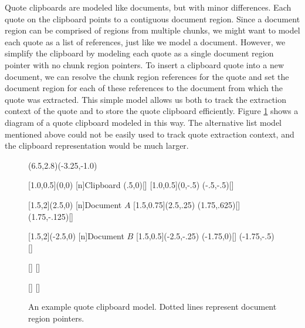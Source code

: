 \documentclass{acm_proc_article-sp}
\begin{document}
Quote clipboards are modeled like documents, but with minor differences.
Each quote on the clipboard points to a contiguous document region.
Since a  document region can be comprised of regions from multiple chunks, we might want to model each quote as a list of references, just like we model a document.
However, we simplify the clipboard by modeling each quote as a single document region pointer with no chunk region pointers.
To insert a clipboard quote into a new document, we can resolve the chunk region references for the quote and set the document region for each of these references to the document from which the quote was extracted.
This simple model allows us both to track the extraction context of the quote and to store the quote clipboard efficiently.
Figure \ref{fig:quoteClipboardModel} shows a diagram of a quote clipboard modeled in this way.
The alternative list model mentioned above could not be easily used to track quote extraction context, and the clipboard representation would be much larger.


\begin{figure}[b]
\begin{center}

\begin{graph}(6.5,2.8)(-3.25,-1.0)
\opaquetextfalse


[1.0,0.5](0,0)
[n]{Clipboard}
(.5,0)[]
[1.0,0.5](0,-.5)
(-.5,-.5)[]


[1.5,2](2.5,0)     
[n]{Document $A$}
[1.5,0.75](2.5,.25)  
(1.75,.625)[]
(1.75,-.125)[]


[1.5,2](-2.5,0)     
[n]{Document $B$}
[1.5,0.5](-2.5,-.25)  
(-1.75,0)[]
(-1.75,-.5)[]



[]
[]

[]
[]

\end{graph}

\caption{An example quote clipboard model.  Dotted lines represent document region pointers.}
\label{fig:quoteClipboardModel}

\end{center}

\end{figure}
\end{document}
